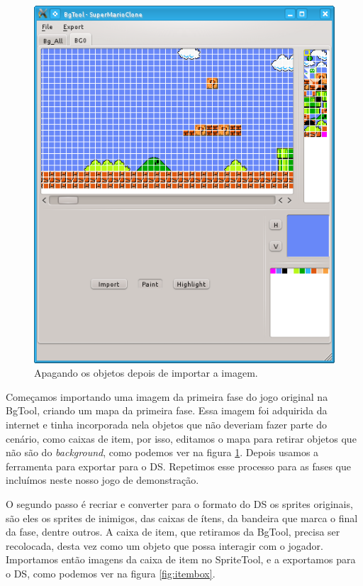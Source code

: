 \documentclass[brazil]{abnt}
\begin{document}
\begin{figure}[h!]
\centering
\includegraphics[scale=.5]{imgs/bgtool2.png}
\caption{Apagando os objetos depois de importar a imagem.}
\label{fig:objetos}
\end{figure}

Começamos importando uma imagem da primeira fase do jogo original na BgTool, criando um mapa da primeira fase. Essa imagem foi adquirida da internet e tinha incorporada nela objetos que não deveriam fazer parte do cenário, como caixas de item, por isso, editamos o mapa para retirar objetos que não são do \textit{background}, como podemos ver na figura \ref{fig:objetos}. Depois usamos a ferramenta para exportar para o DS. Repetimos esse processo para as fases que incluímos neste nosso jogo de demonstração.

O segundo passo é recriar e converter para o formato do DS os sprites originais, são eles os sprites de inimigos, das caixas de ítens, da bandeira que marca o final da fase, dentre outros. A caixa de item, que retiramos da BgTool, precisa ser recolocada, desta vez como um objeto que possa interagir com o jogador. Importamos então imagens da caixa de item no SpriteTool, e a exportamos para o DS, como podemos ver na figura \ref{fig:itembox}.
\end{document}
